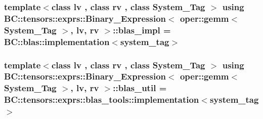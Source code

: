 \subsubsection[{\texorpdfstring{blas\+\_\+impl}{blas_impl}}]{\setlength{\rightskip}{0pt plus 5cm}template$<$class lv , class rv , class System\+\_\+\+Tag $>$ using {\bf B\+C\+::tensors\+::exprs\+::\+Binary\+\_\+\+Expression}$<$ {\bf oper\+::gemm}$<$ System\+\_\+\+Tag $>$, lv, rv $>$\+::{\bf blas\+\_\+impl} =  B\+C\+::blas\+::implementation$<${\bf system\+\_\+tag}$>$}\hypertarget{structBC_1_1tensors_1_1exprs_1_1Binary__Expression_3_01oper_1_1gemm_3_01System__Tag_01_4_00_01lv_00_01rv_01_4_a7dbeec9fb2bb93402b455075ecb38016}{}\label{structBC_1_1tensors_1_1exprs_1_1Binary__Expression_3_01oper_1_1gemm_3_01System__Tag_01_4_00_01lv_00_01rv_01_4_a7dbeec9fb2bb93402b455075ecb38016}
\subsubsection[{\texorpdfstring{blas\+\_\+util}{blas_util}}]{\setlength{\rightskip}{0pt plus 5cm}template$<$class lv , class rv , class System\+\_\+\+Tag $>$ using {\bf B\+C\+::tensors\+::exprs\+::\+Binary\+\_\+\+Expression}$<$ {\bf oper\+::gemm}$<$ System\+\_\+\+Tag $>$, lv, rv $>$\+::{\bf blas\+\_\+util} =  B\+C\+::tensors\+::exprs\+::blas\+\_\+tools\+::implementation$<${\bf system\+\_\+tag}$>$}\hypertarget{structBC_1_1tensors_1_1exprs_1_1Binary__Expression_3_01oper_1_1gemm_3_01System__Tag_01_4_00_01lv_00_01rv_01_4_ad3212d256acfdb087e1c15d7d15f7589}{}\label{structBC_1_1tensors_1_1exprs_1_1Binary__Expression_3_01oper_1_1gemm_3_01System__Tag_01_4_00_01lv_00_01rv_01_4_ad3212d256acfdb087e1c15d7d15f7589}

